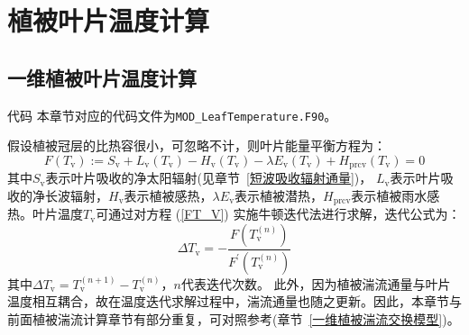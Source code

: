 \chapter{植被叶片温度计算}\label{植被叶片温度计算}
\section{一维植被叶片温度计算}\label{一维植被温度计算}

\begin{mymdframed}{代码}
  本章节对应的代码文件为\texttt{MOD\_LeafTemperature.F90}。
\end{mymdframed}

假设植被冠层的比热容很小，可忽略不计，则叶片能量平衡方程为：
\begin{equation}\label{FT_V}
  F\left(T_{\mathrm{v}}\right):=S_{\mathrm{v}}+L_{\mathrm{v}}\left(T_{\mathrm{v}}\right)-H_{\mathrm{v}}\left(T_{\mathrm{v}}\right)-\lambda E_{\mathrm{v}}\left(T_{\mathrm{v}}\right)+H_{\mathrm{p r c v}}\left(T_{\mathrm{v}}\right)=0
\end{equation}
其中$S_{\mathrm v}$表示叶片吸收的净太阳辐射(见章节~\ref{短波吸收辐射通量})，
$L_{\mathrm v}$表示叶片吸收的净长波辐射，$H_{\mathrm v}$表示植被感热，$\lambda E_{\mathrm v}$表示植被潜热，$H_{\mathrm{prcv}}$表示植被雨水感热。叶片温度$T_{\mathrm v}$可通过对方程 (\ref{FT_V}) 实施牛顿迭代法进行求解，迭代公式为：
\begin{equation}
  \Delta T_{\mathrm{v}}=-\frac{F\left(T_{\mathrm{v}}^{(n)}\right)}{F^{\prime}\left(T_{\mathrm{v}}^{(n)}\right)}
\end{equation}
其中$\Delta T_{\mathrm v}=T_{\mathrm v}^{\left(n+1\right)}-T_{\mathrm v}^{\left(n\right)}$，$n$代表迭代次数。
此外，因为植被湍流通量与叶片温度相互耦合，故在温度迭代求解过程中，湍流通量也随之更新。因此，本章节与前面植被湍流计算章节有部分重复，可对照参考(章节~\ref{一维植被湍流交换模型})。

